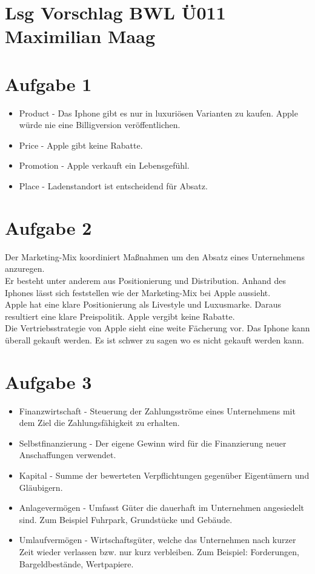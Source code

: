\documentclass{article}
\begin{document}
	\section*{Lsg Vorschlag BWL Ü011 Maximilian Maag}
	\section*{Aufgabe 1}
	\begin{itemize}
		\item  Product - Das Iphone gibt es nur in luxuriösen Varianten zu kaufen. Apple würde nie eine Billigversion veröffentlichen.
		\item  Price - Apple gibt keine Rabatte.
		\item  Promotion - Apple verkauft ein Lebensgefühl. 
		\item  Place - Ladenstandort ist entscheidend für Absatz.
	\end{itemize}
	\section*{Aufgabe 2}
	Der Marketing-Mix koordiniert Maßnahmen um den Absatz eines Unternehmens anzuregen. \\
	Er besteht unter anderem aus Positionierung und Distribution. Anhand des Iphones lässt sich feststellen wie der Marketing-Mix bei Apple aussieht. \\
	Apple hat eine klare Positionierung als Livestyle und Luxusmarke. Daraus resultiert eine klare Preispolitik. Apple vergibt keine Rabatte. \\
	Die Vertriebsstrategie von Apple sieht eine weite Fächerung vor. Das Iphone kann überall gekauft werden. Es ist schwer zu sagen wo es nicht gekauft werden kann.
	\section*{Aufgabe 3}
	\begin{itemize}
		\item Finanzwirtschaft - Steuerung der Zahlungsströme eines Unternehmens mit dem Ziel die Zahlungsfähigkeit zu erhalten.
		\item Selbstfinanzierung - Der eigene Gewinn wird für die Finanzierung neuer Anschaffungen verwendet.
		\item Kapital - Summe der bewerteten Verpflichtungen gegenüber Eigentümern und Gläubigern.
		\item Anlagevermögen - Umfasst Güter die dauerhaft im Unternehmen angesiedelt sind. Zum Beispiel Fuhrpark, Grundstücke und Gebäude.
		\item Umlaufvermögen - Wirtschaftsgüter, welche das Unternehmen nach kurzer Zeit wieder verlassen bzw. nur kurz verbleiben. Zum Beispiel: Forderungen, Bargeldbestände, Wertpapiere.
	\end{itemize}
\end{document}

